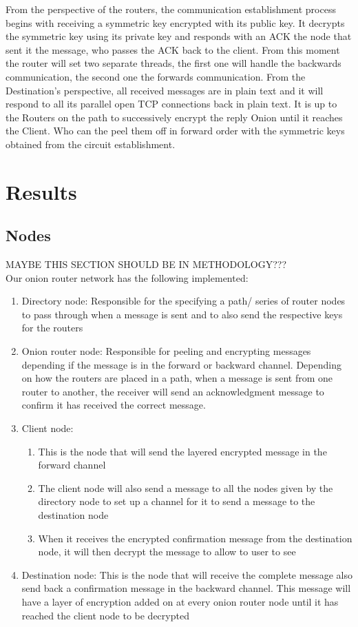 \documentclass[10pt]{report}
\begin{document}
\noindent From the perspective of the routers, the communication establishment process begins with receiving a symmetric key encrypted with its public key.  
It decrypts the symmetric key using its private key and responds with an ACK the node that sent it the message, who passes the ACK back to the client. 
From this moment the router will set two separate threads, the first one will handle the backwards communication, the second one the forwards communication. 
From the Destination’s perspective, all received messages are in plain text and it will respond to all its parallel open TCP connections back in plain text. 
It is up to the Routers on the path to successively encrypt the reply Onion until it reaches the Client. Who can the peel them off in forward order with the symmetric keys obtained from the circuit establishment.

\chapter{Results}
\section{Nodes}
MAYBE THIS SECTION SHOULD BE IN METHODOLOGY???\\
Our onion router network has the following implemented: 
\begin{enumerate}
    \item Directory node: Responsible for the specifying a path/ series of router nodes to pass through when a message is sent and to also send the respective keys for the routers
    \item Onion router node: Responsible for peeling and encrypting messages depending if the message is in the forward or backward channel. Depending on how the routers are placed in a path, when a message is sent from one router to another, the receiver will send an acknowledgment message to confirm it has received the correct message.
    \item Client node:
    \begin{enumerate}
        \item This is the node that will send the layered encrypted message in the forward channel
        \item The client node will also send a message to all the nodes given by the directory node to set up a channel for it to send a message to the destination node
        \item When it receives the encrypted confirmation message from the destination node, it will then decrypt the message to allow to user to see
    \end{enumerate}
    \item Destination node: This is the node that will receive the complete message also send back a confirmation message in the backward channel. This message will have a layer of encryption added on at every onion router node until it has reached the client node to be decrypted
\end{enumerate}
\end{document}
